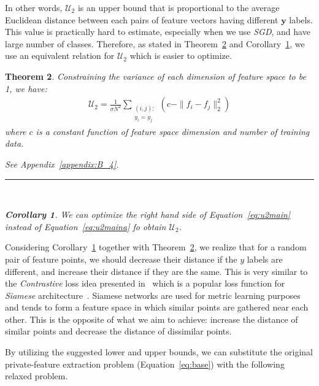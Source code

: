 \documentclass[10pt,journal,compsoc]{IEEEtran}
\newcommand{\BlackBox}{\rule{1.5ex}{1.5ex}}  %
\newenvironment{proof}{\par\noindent{\bf Proof\ }}{\hfill\BlackBox\\[2mm]}
\newtheorem{theorem}{Theorem}
\newtheorem{corollary}[theorem]{Corollary}
\begin{document}
In other words, $\mathcal{U}_2$ is an upper bound that is proportional to the average Euclidean distance between each pairs of feature vectors having different $\textbf{y}$ labels. This value is practically hard to estimate, especially when we use \emph{SGD}, and have large number of classes. Therefore, as stated in Theorem~\ref{th3} and Corollary~\ref{corol}, we use an equivalent relation for $\mathcal{U}_2$ which is easier to optimize.

\begin{theorem} \label{th3}
	Constraining the variance of each dimension of feature space to be 1, we have:
	\begin{align}\label{eq:u2main}
	\mathcal{U}_2 = \frac{1}{\sigma N^2}\sum_{\substack{(i,j):\\y_i = y_j}} (c - \|f_i-f_j\|_2^2) 
	\end{align}
	where $c$ is a constant function of feature space dimension and number of training data. 
	\begin{proof}
		See Appendix~\ref{appendix:B_4}.
	\end{proof}
	\begin{corollary} \label{corol}
		We can optimize the right hand side of Equation~\ref{eq:u2main} instead of Equation~\ref{eq:u2maina} fo obtain $\mathcal{U}_2$. %
	\end{corollary}
\end{theorem}Considering Corollary~\ref{corol} together with Theorem~\ref{th3}, we realize that for a random pair of feature points, we should decrease their distance if the $y$ labels are different, and increase their distance if they are the same. This is very similar to the \emph{Contrastive} loss idea presented in~\cite{hadsell2006} which is a popular loss function for \emph{Siamese} architecture~\cite{chopra2005}. Siamese networks are used for metric learning purposes and tends to form a feature space in which similar points are gathered near each other. This is the opposite of what we aim to achieve: increase the distance of similar points and decrease the distance of dissimilar points. 


By utilizing the suggested lower and upper bounds, we can substitute the original private-feature extraction problem (Equation~\ref{eq:base}) with the following relaxed problem.
\end{document}
